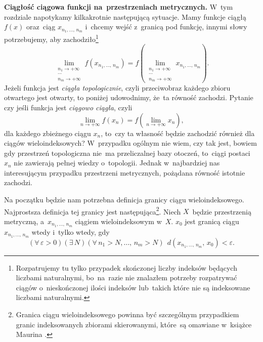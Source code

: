 \documentclass[a4paper,11pt]{article}
\numberwithin{equation}{section}
\begin{document}
\label{sec:-ETC-Uwagi-ogolne}


\noindent
\textbf{Ciągłość ciągowa funkcji na~przestrzeniach metrycznych.}
W~tym rozdziale napotykamy kilkakrotnie następującą sytuacje. Mamy
funkcje ciągłą $f( x )$ oraz~ciąg $x_{ n_{ 1 }, \ldots, \, n_{ m } }$
i~chcemy wejść z~granicą pod funkcję, innymi słowy potrzebujemy, aby
zachodziło\footnote{Rozpatrujemy tu tylko przypadek skończonej liczby
  indeksów będących liczbami naturalnymi, bo~na~razie nie znalazłem
  potrzeby rozpatrywać ciągów o~nieskończonej ilości indeksów
  lub~takich które nie są indeksowane liczbami naturalnymi.}
\begin{equation}
  \label{eq:RS-Vol-I-s01-08}
  \lim\limits_{ \substack{ n_{ 1 } \to +\infty \\
      \cdots \\
      n_{ m } \to +\infty } }
  f( x_{ n_{ 1 }, \ldots, \, n_{ m } } ) =
  f( \lim_{ \substack{ n_{ 1 } \to +\infty \\
      \cdots \\
      n_{ m } \to +\infty } }
  x_{ n_{ 1 }, \ldots, \, n_{ m } } ).
\end{equation}
Jeżeli funkcja jest \textit{ciągła topologicznie}, czyli przeciwobraz
każdego zbioru otwartego jest otwarty, to poniżej udowodnimy, że~ta
równość zachodzi. Pytanie czy jeśli funkcja jest \textit{ciągowo
  ciągła}, czyli
\begin{equation}
  \label{eq:RS-Vol-I-s01-09}
  \lim\limits_{ n \to +\infty } f( x_{ n } ) =
  f( \lim\limits_{ n \to +\infty } x_{ n } ),
\end{equation}
dla każdego zbieżnego ciągu $x_{ n }$, to~czy ta własność będzie
zachodzić również dla ciągów wieloindeksowych? W~przypadku ogólnym nie
wiem, czy tak jest, bowiem gdy przestrzeń topologiczna nie~ma
przeliczalnej bazy otoczeń, to~ciągi postaci $x_{ n }$ nie zawierają
pełnej wiedzy o~topologii. Jednak w~najbardziej nas interesującym
przypadku przestrzeni metrycznych, pożądana równość istotnie zachodzi.

Na początku będzie nam potrzebna definicja granicy ciągu
wieloindeksowego. Najprostsza definicja tej granicy jest
następująca\footnote{Granica ciągu wieloindeksowego powinna być
  szczególnym przypadkiem granic indeksowanych zbiorami skierowanymi,
  które~są omawiane w~książce Maurina
  \parencite{Maurin-Analiza-Vol-I-Pub-1974}.}. Niech
$X$~będzie przestrzenią metryczną, a~$x_{ n_{ 1 }, \ldots, \, n_{ m } }$
ciągiem wieloindeksowym w~$X$. $x_{ 0 }$ jest granicą ciągu
$x_{ n_{ 1 }, \ldots, \, n_{ m } }$ wtedy i~tylko wtedy, gdy
\begin{equation}
  \label{eq:RS-Vol-I-s01-10}
  ( \forall \, \varepsilon > 0) ( \exists \, N )
  ( \forall \, n_{ 1 } > N, \ldots, \, n_{ m } > N ) \;\,
  d( x_{ n_{ 1 }, \ldots, \, n_{ m } }, \, x_{ 0 } ) < \varepsilon.
\end{equation}
\end{document}
